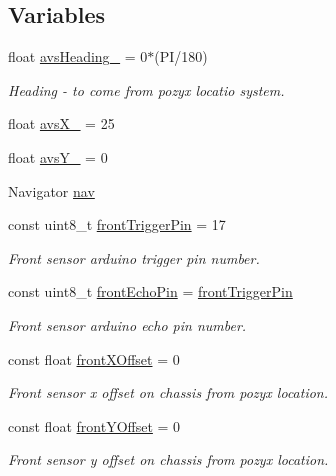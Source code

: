 \subsection*{Variables}
\begin{DoxyCompactItemize}
\item 
float \mbox{\hyperlink{bot_main_8ino_a26ae4f60d3d4ebfa68763710b6f20e7c}{avs\+Heading\+\_\+}} = 0$\ast$(PI/180)
\begin{DoxyCompactList}\small\item\em Heading -\/ to come from pozyx locatio system. \end{DoxyCompactList}\item 
float \mbox{\hyperlink{bot_main_8ino_a36b5ddac5fd4781d96ab1f7afb628e63}{avs\+X\+\_\+}} = 25
\item 
float \mbox{\hyperlink{bot_main_8ino_aa4d40143b7595abf8807c96ac5fd82e2}{avs\+Y\+\_\+}} = 0
\item 
Navigator \mbox{\hyperlink{bot_main_8ino_a4d757d2a3d2bcf4b98f6f4a72d7df7de}{nav}}
\item 
const uint8\+\_\+t \mbox{\hyperlink{bot_main_8ino_a33df7a8dbfd90327fda79c01f944f56a}{front\+Trigger\+Pin}} = 17
\begin{DoxyCompactList}\small\item\em Front sensor arduino trigger pin number. \end{DoxyCompactList}\item 
const uint8\+\_\+t \mbox{\hyperlink{bot_main_8ino_a878ae4b68ec48fc902c4aa953ad565b4}{front\+Echo\+Pin}} = \mbox{\hyperlink{bot_main_8ino_a33df7a8dbfd90327fda79c01f944f56a}{front\+Trigger\+Pin}}
\begin{DoxyCompactList}\small\item\em Front sensor arduino echo pin number. \end{DoxyCompactList}\item 
const float \mbox{\hyperlink{bot_main_8ino_abdd898a2dfa2f64e2821af36c6ed3724}{front\+X\+Offset}} = 0
\begin{DoxyCompactList}\small\item\em Front sensor x offset on chassis from pozyx location. \end{DoxyCompactList}\item 
const float \mbox{\hyperlink{bot_main_8ino_a4919465d0182f44aa7acaa39ece1e17a}{front\+Y\+Offset}} = 0
\begin{DoxyCompactList}\small\item\em Front sensor y offset on chassis from pozyx location. \end{DoxyCompactList}\item 

\end{DoxyCompactItemize}
